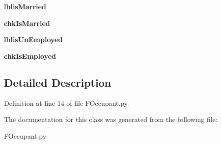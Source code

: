 \begin{DoxyCompactItemize}
\mbox{\label{class_f_occupant_1_1_frm_occupant_a34af38285450b3293b4f7de025ccc98b}} 
{\bfseries lblis\+Married}
\item 
\mbox{\label{class_f_occupant_1_1_frm_occupant_af64bb6ab006e18701d6608114eb4fc87}} 
{\bfseries chk\+Is\+Married}
\item 
\mbox{\label{class_f_occupant_1_1_frm_occupant_a9643b8c0a42bd97c33043dc367a776af}} 
{\bfseries lblis\+Un\+Employed}
\item 
\mbox{\label{class_f_occupant_1_1_frm_occupant_aff560f3f01994103c88d7e44bda65316}} 
{\bfseries chk\+Is\+Employed}
\end{DoxyCompactItemize}


\subsection{Detailed Description}


Definition at line 14 of file F\+Occupant.\+py.



The documentation for this class was generated from the following file\+:\begin{DoxyCompactItemize}
\item 
F\+Occupant.\+py\end{DoxyCompactItemize}
